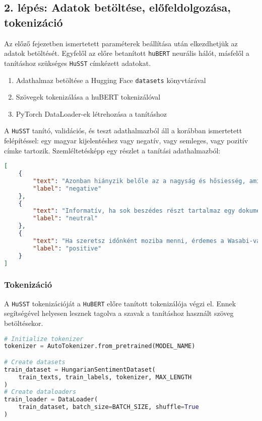 \documentclass[12pt]{article}
\begin{document}
\subsection{2. lépés: Adatok betöltése, előfeldolgozása, tokenizáció}

Az előző fejezetben ismertetett paraméterek beállítása után elkezdhetjük az adatok betöltését. Egyfelől az előre betanított \texttt{huBERT} neurális hálót, másfelől a tanításhoz szükséges \texttt{HuSST} címkézett adatokat.

\begin{enumerate}
    \item Adathalmaz betöltése a Hugging Face \texttt{datasets} könyvtárával
    \item Szövegek tokenizálása a huBERT tokenizálóval
    \item PyTorch DataLoader-ek létrehozása a tanításhoz
\end{enumerate}

A \texttt{HuSST} tanító, validációs, és teszt adathalmazból áll a korábban ismertetett felépítéssel: egy magyar kijelentéshez vagy negatív, vagy semleges, vagy pozitív címke tartozik. Szemléltetésképp egy részlet a tanítási adathalmazból:

\begin{lstlisting}[language=json, caption=Minta a HuSST adathalmazból]
[
    {
        "text": "Azonban hiányzik belőle az a nagyság és hősiesség, ami Stevensont és a korábbi Disney-meséket jellemzi.",
        "label": "negative"
    },
    {
        "text": "Informatív, ha sok beszédes részt tartalmaz egy dokumentumfilm.",
        "label": "neutral"
    },
    {
        "text": "Ha szeretsz időnként moziba menni, érdemes a Wasabi-val kezdeni.",
        "label": "positive"
    }
]
\end{lstlisting}

\subsubsection{Tokenizáció}
A \texttt{HuSST} tokenizációját a \texttt{HuBERT} előre tanított tokenizálója végzi el. Ennek segítségével helyesen lesznek tagolva  a szavak a tanításhoz használt szöveg betöltésekor.

\begin{lstlisting}[language=Python,caption=Tokenizáció]
# Initialize tokenizer
tokenizer = AutoTokenizer.from_pretrained(MODEL_NAME)

# Create datasets
train_dataset = HungarianSentimentDataset(
    train_texts, train_labels, tokenizer, MAX_LENGTH
)
# Create dataloaders
train_loader = DataLoader(
    train_dataset, batch_size=BATCH_SIZE, shuffle=True
)
\end{lstlisting}
\end{document}
